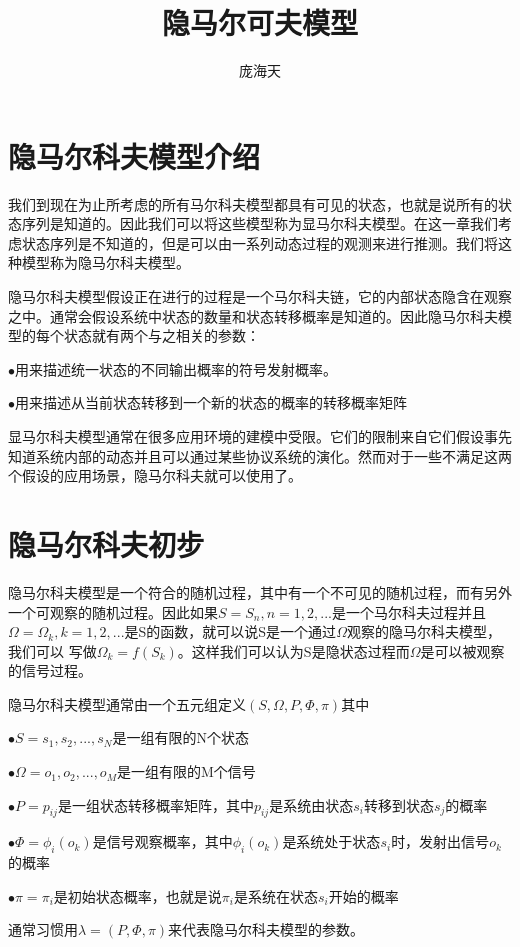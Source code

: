 \documentclass[UTF8]{ctexart}
\begin{document}
\title{隐马尔可夫模型}
\author{庞海天}
\maketitle
\section{隐马尔科夫模型介绍}
我们到现在为止所考虑的所有马尔科夫模型都具有可见的状态，也就是说所有的状态序列是知道的。因此我们可以将这些模型称为显马尔科夫模型。在这一章我们考虑状态序列是不知道的，但是可以由一系列动态过程的观测来进行推测。我们将这种模型称为隐马尔科夫模型。

隐马尔科夫模型假设正在进行的过程是一个马尔科夫链，它的内部状态隐含在观察之中。通常会假设系统中状态的数量和状态转移概率是知道的。因此隐马尔科夫模型的每个状态就有两个与之相关的参数：

$\bullet$用来描述统一状态的不同输出概率的符号发射概率。

$\bullet$用来描述从当前状态转移到一个新的状态的概率的转移概率矩阵

显马尔科夫模型通常在很多应用环境的建模中受限。它们的限制来自它们假设事先知道系统内部的动态并且可以通过某些协议系统的演化。然而对于一些不满足这两个假设的应用场景，隐马尔科夫就可以使用了。

\section{隐马尔科夫初步}
隐马尔科夫模型是一个符合的随机过程，其中有一个不可见的随机过程，而有另外一个可观察的随机过程。因此如果$S={S_n,n=1,2,...}$是一个马尔科夫过程并且$\Omega={\Omega_k,k=1,2,...}$是S的函数，就可以说S是一个通过$\Omega$观察的隐马尔科夫模型，我们可以
写做$\Omega_k=f(S_k)$。这样我们可以认为S是隐状态过程而$\Omega$是可以被观察的信号过程。

隐马尔科夫模型通常由一个五元组定义$(S,\Omega,P,\Phi,\pi)$其中

$\bullet S={s_1,s_2,...,s_N}$是一组有限的N个状态

$\bullet \Omega={o_1,o_2,...,o_M}$是一组有限的M个信号

$\bullet P={p_{ij}}$是一组状态转移概率矩阵，其中$p_{ij}$是系统由状态$s_i$转移到状态$s_j$的概率

$\bullet \Phi={\phi_i(o_k)}$是信号观察概率，其中${\phi_i(o_k)}$是系统处于状态$s_i$时，发射出信号$o_k$的概率

$\bullet \pi={\pi_i}$是初始状态概率，也就是说$\pi_i$是系统在状态$s_i$开始的概率

通常习惯用$\lambda = (P,\Phi,\pi)$来代表隐马尔科夫模型的参数。
\end{document}
